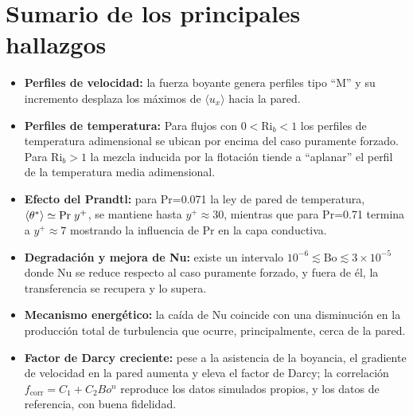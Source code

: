 \newpage
\section{Sumario de los principales hallazgos}

\begin{itemize}

\item \textbf{Perfiles de velocidad:} la fuerza boyante genera perfiles tipo ``M'' y su incremento desplaza los máximos de $\langle u_x\rangle$ hacia la pared.

\item \textbf{Perfiles de temperatura:} Para flujos con $0 < \text{Ri}_b < 1$ los perfiles de temperatura adimensional se ubican por encima del caso puramente forzado. Para $\text{Ri}_b > 1$  la mezcla inducida por la flotación tiende a ``aplanar'' el perfil de la temperatura media adimensional.

\item \textbf{Efecto del Prandtl:} para Pr=0.071 la ley de pared de temperatura, $\langle\theta^*\rangle \simeq \text{Pr} \hspace{1mm} y^+$, se mantiene hasta $y^+ \approx 30$, mientras que para Pr=0.71 termina a $y^+ \approx 7$ mostrando la influencia de Pr en la capa conductiva.

\item \textbf{Degradación y mejora de Nu:} existe un intervalo $10^{-6} \lesssim \text{Bo} \lesssim 3 \times 10^{-5}$ donde Nu se reduce respecto al caso puramente forzado, y fuera de él, la transferencia se recupera y lo supera.

\item \textbf{Mecanismo energético:} la caída de Nu coincide con una disminución en la producción total de turbulencia que ocurre, principalmente, cerca de la pared.

\item \textbf{Factor de Darcy creciente:} pese a la asistencia de la boyancia, el gradiente de velocidad en la pared aumenta y eleva el factor de Darcy; la correlación $f_{\text{corr}}=C_1+C_2 Bo^n$ reproduce los datos simulados propios, y los datos de referencia, con buena fidelidad.

\end{itemize}

